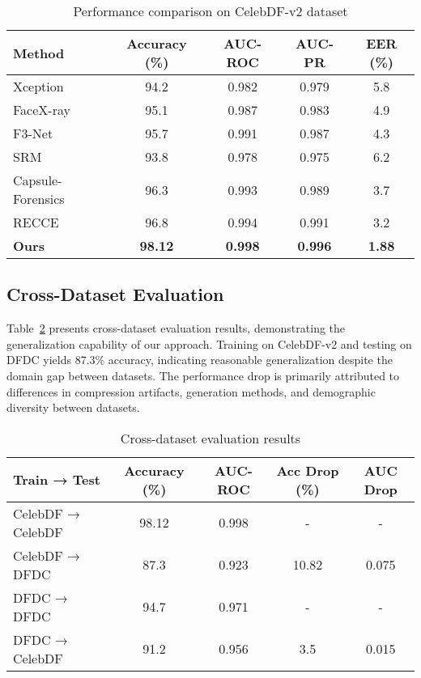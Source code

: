 \documentclass[letterpaper]{article} %
\begin{document}
\begin{table}[h]
\centering
\caption{Performance comparison on CelebDF-v2 dataset}
\label{tab:main_results}
\begin{tabular}{lcccc}
\toprule
Method & Accuracy (\%) & AUC-ROC & AUC-PR & EER (\%) \\
\midrule
Xception & 94.2 & 0.982 & 0.979 & 5.8 \\
FaceX-ray & 95.1 & 0.987 & 0.983 & 4.9 \\
F3-Net & 95.7 & 0.991 & 0.987 & 4.3 \\
SRM & 93.8 & 0.978 & 0.975 & 6.2 \\
Capsule-Forensics & 96.3 & 0.993 & 0.989 & 3.7 \\
RECCE & 96.8 & 0.994 & 0.991 & 3.2 \\
\textbf{Ours} & \textbf{98.12} & \textbf{0.998} & \textbf{0.996} & \textbf{1.88} \\
\bottomrule
\end{tabular}
\end{table}

\subsection{Cross-Dataset Evaluation}

Table~\ref{tab:cross_dataset} presents cross-dataset evaluation results, demonstrating the generalization capability of our approach. Training on CelebDF-v2 and testing on DFDC yields 87.3\% accuracy, indicating reasonable generalization despite the domain gap between datasets. The performance drop is primarily attributed to differences in compression artifacts, generation methods, and demographic diversity between datasets.

\begin{table}[h]
\centering
\caption{Cross-dataset evaluation results}
\label{tab:cross_dataset}
\begin{tabular}{lcccc}
\toprule
Train → Test & Accuracy (\%) & AUC-ROC & Acc Drop (\%) & AUC Drop \\
\midrule
CelebDF → CelebDF & 98.12 & 0.998 & - & - \\
CelebDF → DFDC & 87.3 & 0.923 & 10.82 & 0.075 \\
DFDC → DFDC & 94.7 & 0.971 & - & - \\
DFDC → CelebDF & 91.2 & 0.956 & 3.5 & 0.015 \\
\bottomrule
\end{tabular}
\end{table}
\end{document}
